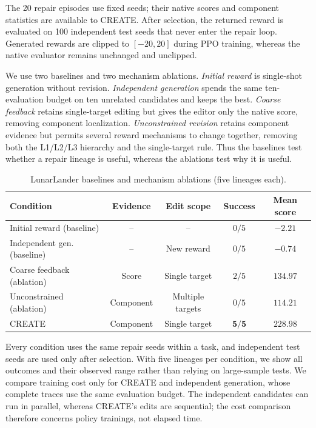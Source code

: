 \documentclass[conference]{IEEEtran}
\begin{document}
The 20 repair episodes use fixed seeds; their native scores and component
statistics are available to CREATE. After selection, the returned reward is
evaluated on 100 independent test seeds that never enter the repair loop.
Generated rewards are clipped to $[-20,20]$ during PPO training, whereas the
native evaluator remains unchanged and unclipped.

We use two baselines and two mechanism ablations. \emph{Initial reward} is
single-shot generation without revision. \emph{Independent generation} spends
the same ten-evaluation budget on ten unrelated candidates and keeps the best.
\emph{Coarse feedback} retains single-target editing but gives the editor only
the native score, removing component localization. \emph{Unconstrained
revision} retains component evidence but permits several reward mechanisms to
change together, removing both the L1/L2/L3 hierarchy and the single-target
rule. Thus the baselines test whether a repair lineage is useful, whereas the
ablations test why it is useful.

\begin{table}[H]
\caption{LunarLander baselines and mechanism ablations (five lineages each).}
\label{tab:baseline}
\centering
\scriptsize
\setlength{\tabcolsep}{3.1pt}
\begin{tabular}{lcccc}
\toprule
Condition & Evidence & Edit scope & Success & Mean score \\
\midrule
Initial reward (baseline) & -- & -- & $0/5$ & $-2.21$ \\
Independent gen. (baseline) & -- & New reward & $0/5$ & $-0.74$ \\
Coarse feedback (ablation) & Score & Single target & $2/5$ & $134.97$ \\
Unconstrained (ablation) & Component & Multiple targets & $0/5$ & $114.21$ \\
CREATE & Component & Single target & $\mathbf{5/5}$ & $\mathbf{228.98}$ \\
\bottomrule
\end{tabular}
\end{table}

Every condition uses the same repair seeds within a task, and independent test
seeds are used only after selection. With five lineages per condition, we show
all outcomes and their observed range rather than relying on large-sample
tests. We compare training cost only for CREATE and independent generation,
whose complete traces use the same evaluation budget. The independent
candidates can run in parallel, whereas CREATE's edits are sequential; the
cost comparison therefore concerns policy trainings, not elapsed time.
\end{document}
